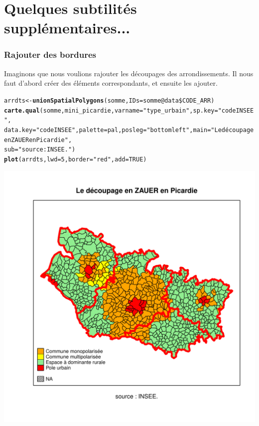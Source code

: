 \documentclass[slidetop, 10pt]{beamer}\usepackage{graphicx, color}
\makeatletter
\newcommand{\hlfunctioncall}[1]{\textcolor[rgb]{0.501960784313725,0,0.329411764705882}{\textbf{#1}}}%
\newcommand{\hlstring}[1]{\textcolor[rgb]{0.6,0.6,1}{#1}}%
\newenvironment{kframe}{%
 \def\at@end@of@kframe{}%
 \ifinner\ifhmode%
  \def\at@end@of@kframe{\end{minipage}}%
  \begin{minipage}{\columnwidth}%
 \fi\fi%
 \def\FrameCommand##1{\hskip\@totalleftmargin \hskip-\fboxsep
 \colorbox{shadecolor}{##1}\hskip-\fboxsep
     \hskip-\linewidth \hskip-\@totalleftmargin \hskip\columnwidth}%
 \MakeFramed {\advance\hsize-\width
   \@totalleftmargin\z@ \linewidth\hsize
   \@setminipage}}%
 {\par\unskip\endMakeFramed%
 \at@end@of@kframe}
\newenvironment{knitrout}{}{} %
\renewenvironment{knitrout}{\begin{tiny}}{\end{tiny}}
\makeatother
\begin{document}
\section{Quelques subtilités supplémentaires...}
\begin{frame}[fragile]
\frametitle{Rajouter des bordures}
Imaginons que nous voulions rajouter les découpages des arrondissements. Il nous faut d'abord créer des éléments correspondants, et ensuite les ajouter.

\begin{knitrout}\tiny
{}\color{fgcolor}\begin{kframe}
\begin{alltt}
arrdts <- \hlfunctioncall{unionSpatialPolygons}(somme, IDs = somme@data\$CODE\_ARR)
\hlfunctioncall{carte.qual}(somme, mini\_picardie, varname = \hlstring{"type\_urbain"}, sp.key = \hlstring{"codeINSEE"}, 
    data.key = \hlstring{"codeINSEE"}, palette = pal, posleg = \hlstring{"bottomleft"}, main = \hlstring{"Le découpage en ZAUER en Picardie"}, 
    sub = \hlstring{"source : INSEE."})
\hlfunctioncall{plot}(arrdts, lwd = 5, border = \hlstring{"red"}, add = TRUE)
\end{alltt}
\end{kframe}

{\centering \includegraphics[width=.45\textwidth]{images/fusion} 

}


\end{knitrout}



\end{frame}
\end{document}
